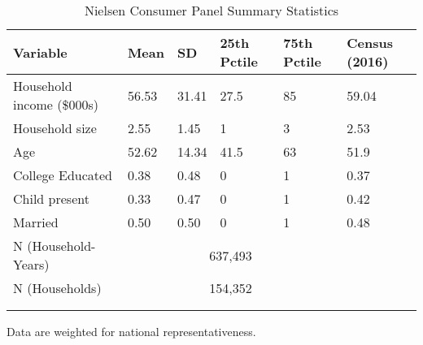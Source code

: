 \begin{table}[!htbp] \centering
\caption{Nielsen Consumer Panel Summary Statistics}
\label{tab:homescanSummaryStats}
\begin{tabularx}{\textwidth}{lXXXXX}
\\[-1.8ex]\hline
\hline
Variable                  & Mean  & SD    & 25th Pctile & 75th Pctile & Census (2016) \\
\hline
Household income (\$000s) & 56.53 & 31.41 & 27.5        & 85 & 59.04 \\
Household size            & 2.55  & 1.45  & 1           & 3  & 2.53 \\
Age                       & 52.62 & 14.34 & 41.5        & 63 & 51.9 \\
College Educated          & 0.38  & 0.48  & 0           & 1  & 0.37 \\
Child present             & 0.33  & 0.47  & 0           & 1  & 0.42 \\
Married                   & 0.50  & 0.50  & 0           & 1  & 0.48 \\
\hline
N (Household-Years)       & \multicolumn{4}{c}{637,493} \\
N (Households)            & \multicolumn{4}{c}{154,352} \\
\\[-1.8ex]\hline
\hline \\[-1.8ex]
\end{tabularx}
\begin{tablenotes}
Data are weighted for national representativeness.
\end{tablenotes}
\end{table}
